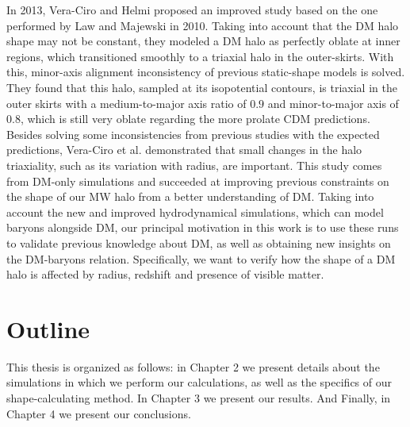 In 2013, Vera-Ciro and Helmi proposed an improved study based on the one performed by Law and Majewski in 2010. Taking into account that the DM halo shape may not be constant, they modeled a DM halo as perfectly oblate at inner regions, which transitioned smoothly to a triaxial halo in the outer-skirts. With this, minor-axis alignment inconsistency of previous static-shape models is solved. They found that this halo, sampled at its isopotential contours, is triaxial in the outer skirts with a medium-to-major axis ratio of $0.9$ and minor-to-major axis of $0.8$, which is still very oblate regarding the more prolate CDM predictions.\\

Besides solving some inconsistencies from previous studies with the expected predictions, Vera-Ciro et al. demonstrated that small changes in the halo triaxiality, such as its variation with radius, are important. This study comes from DM-only simulations and succeeded at improving previous constraints on the shape of our MW halo from a better understanding of DM. Taking into account the new and improved hydrodynamical simulations, which can model baryons alongside DM, our principal motivation in this work is to use these runs to validate previous knowledge about DM, as well as obtaining new insights on the DM-baryons relation. Specifically, we want to verify how the shape of a DM halo is affected by radius, redshift and presence of visible matter.\\

%

\section{Outline}
This thesis is organized as follows: in Chapter 2 we present details about the simulations in which we perform our calculations, as well as the specifics of our shape-calculating method. In Chapter 3 we present our results. And Finally, in Chapter 4 we present our conclusions.  

